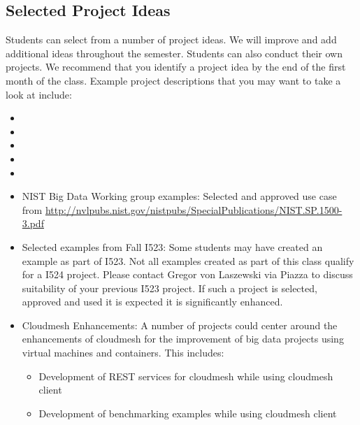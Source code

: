 \subsection{Selected Project Ideas}
\label{\detokenize{i524/index:selected-project-ideas}}\label{\detokenize{i524/index:index-8}}
Students can select from a number of project ideas. We will improve
and add additional ideas throughout the semester. Students can also
conduct their own projects. We recommend that you identify a project
idea by the end of the first month of the class. Example project
descriptions that you may want to take a look at include:
\begin{itemize}
\item {} 

\item {} 

\item {} 

\item {} 

\item {} 

\item {} 
NIST Big Data Working group examples: Selected and approved use case from
\url{http://nvlpubs.nist.gov/nistpubs/SpecialPublications/NIST.SP.1500-3.pdf}

\item {} 
Selected examples from Fall I523:
Some students may have created an example as part of I523. Not all
examples created as part of this class qualify for a I524
project. Please contact Gregor von Laszewski via Piazza to discuss
suitability of your previous I523 project. If such a project is
selected, approved and used it is expected it is significantly
enhanced.

\item {} 
Cloudmesh Enhancements:
A number of projects could center around the enhancements of
cloudmesh for the improvement of big data projects using virtual
machines and containers. This includes:
\begin{itemize}
\item {} 
Development of REST services for cloudmesh while using cloudmesh
client

\item {} 
Development of benchmarking examples while using cloudmesh client


\end{itemize}
\end{itemize}
